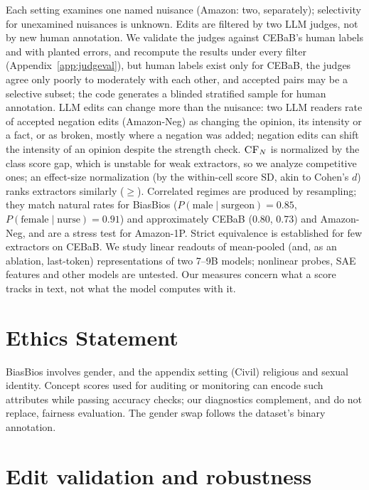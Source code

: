 \documentclass[11pt]{article}
\newcommand{\cfn}{\textsc{CF}_{N}}
\begin{document}
Each setting examines one named nuisance (Amazon: two, separately); selectivity for unexamined nuisances is unknown. Edits are filtered by two LLM judges, not by new human annotation. We validate the judges against CEBaB's human labels and with planted errors, and recompute the results under every filter (Appendix~\ref{app:judgeval}), but human labels exist only for CEBaB, the judges agree only poorly to moderately with each other, and accepted pairs may be a selective subset; the code generates a blinded stratified sample for human annotation. LLM edits can change more than the nuisance: two LLM readers rate \rdWrongNeg{} of accepted negation edits (Amazon-Neg) as changing the opinion, its intensity or a fact, or as broken, mostly where a negation was added; negation edits can shift the intensity of an opinion despite the strength check. $\cfn$ is normalized by the class score gap, which is unstable for weak extractors, so we analyze competitive ones; an effect-size normalization (by the within-cell score SD, akin to Cohen's $d$) ranks extractors similarly ($\geq$\robSDMin). Correlated regimes are produced by resampling; they match natural rates for BiasBios ($P(\text{male}\mid\text{surgeon})=0.85$, $P(\text{female}\mid\text{nurse})=0.91$) and approximately CEBaB (0.80, 0.73) and Amazon-Neg, and are a stress test for Amazon-1P. Strict equivalence is established for few extractors on CEBaB. We study linear readouts of mean-pooled (and, as an ablation, last-token) representations of two 7--9B models; nonlinear probes, SAE features and other models are untested. Our measures concern what a score tracks in text, not what the model computes with it.

\section*{Ethics Statement}

BiasBios involves gender, and the appendix setting (Civil) religious and sexual identity. Concept scores used for auditing or monitoring can encode such attributes while passing accuracy checks; our diagnostics complement, and do not replace, fairness evaluation. The gender swap follows the dataset's binary annotation.



\appendix

\section{Edit validation and robustness}
\label{app:edits}

\end{document}
